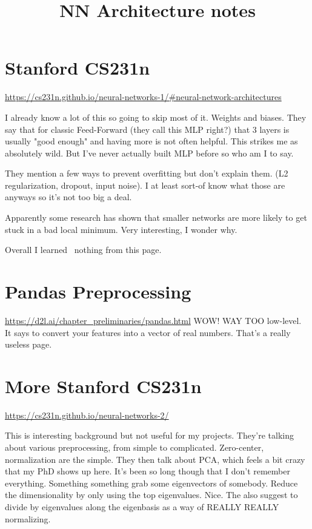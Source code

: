\documentclass[11pt,notitlepage]{report}
\title{NN Architecture notes}
\author{}
\date{}
\theoremstyle{definition}
\theoremstyle{plain}
\begin{document}
\maketitle

\tableofcontents

\chapter{Stanford CS231n}
\url{https://cs231n.github.io/neural-networks-1/#neural-network-architectures}

I already know a lot of this so going to skip most of it. Weights and biases.
They say that for classic Feed-Forward (they call this MLP right?) that 3 layers
is usually "good enough" and having more is not often helpful. This strikes me
as absolutely wild. But I've never actually built MLP before so who am I to say.

They mention a few ways to prevent overfitting but don't explain them.
(L2 regularization, dropout, input noise). I at least sort-of know what those are
anyways so it's not too big a deal.

Apparently some research has shown that smaller networks are more likely to get
stuck in a bad local minimum. Very interesting, I wonder why.

Overall I learned ~nothing from this page.

\chapter{Pandas Preprocessing}
\url{https://d2l.ai/chapter_preliminaries/pandas.html}
WOW! WAY TOO low-level. It says to convert your features into a vector of real numbers.
That's a really useless page.

\chapter{More Stanford CS231n}
\url{https://cs231n.github.io/neural-networks-2/}

This is interesting background but not useful for my projects.
They're talking about various preprocessing, from simple to complicated.
Zero-center, normalization are the simple.
They then talk about PCA, which feels a bit crazy that my PhD shows up here.
It's been so long though that I don't remember everything. Something something
grab some eigenvectors of somebody.
Reduce the dimensionality by only using the top eigenvalues. Nice.
The also suggest to divide by eigenvalues along the eigenbasis as a way of
REALLY REALLY normalizing.
\end{document}
